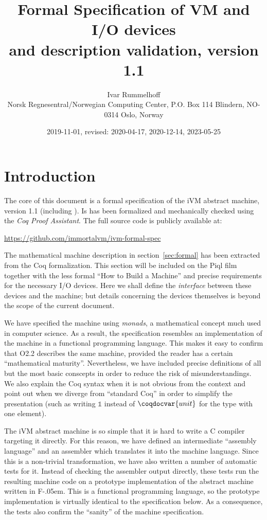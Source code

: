 \documentclass[10pt,a4paper]{article}
\title{%
  Formal Specification of VM and I/O devices\\
  and description validation, version 1.1
}
\author{Ivar Rummelhoff\\
\small Norsk Regnesentral/Norwegian Computing Center, P.O. Box 114 Blindern, NO-0314 Oslo, Norway }
\date{2019-11-01, revised: 2020-04-17, 2020-12-14, 2023-05-25}
\newcommand{\mathbbm}{\mathds}
\newcommand{\FSharp}{\textsf{F\nolinebreak[4]\kern-.05em\raisebox{.2ex}{\small\#}}\xspace}
\begin{document}
\maketitle

\section{Introduction}

The core of this document is a formal specification of the iVM abstract machine, version 1.1 (including ).
Is has been formalized and mechanically checked using the \emph{Coq Proof Assistant}.
The full source code is publicly available at:

\begin{center}
  \url{https://github.com/immortalvm/ivm-formal-spec}
\end{center}

The mathematical machine description in section~\ref{sec:formal} has been extracted from the Coq formalization.
This section will be included on the Piql film together with the less formal ``How to Build a Machine'' and precise requirements for the necessary I/O devices.
Here we shall define the \emph{interface} between these devices and the machine; but details concerning the devices themselves is beyond the scope of the current document.

We have specified the machine using \emph{monads}, a mathematical concept much used in computer science.
As a result, the specification resembles an implementation of the machine in a functional programming language.
This makes it easy to confirm that O2.2 describes the same machine, provided the reader has a certain ``mathematical maturity''.
Nevertheless, we have included precise definitions of all but the most basic conscepts in order to reduce the risk of misunderstandings.
We also explain the Coq syntax when it is not obvious from the context and point out when we diverge from ``standard Coq'' in order to simplify the presentation
(such as writing $\mathbbm{1}$ instead of $\coqdocvar{unit}$ for the type with one element).

The iVM abstract machine is so simple that it is hard to write a C compiler targeting it directly.
For this reason, we have defined an intermediate ``assembly language'' and an assembler which translates it into the machine language.
Since this is a non-trivial transformation, we have also written a number of automatic tests for it.
Instead of checking the assembler output directly, these tests run the resulting machine code on a prototype implementation of the abstract machine written in \FSharp.
This is a functional programming language, so the prototype implementation is virtually identical to the specification below.
As a consequence, the tests also confirm the ``sanity'' of the machine specification.
\end{document}
